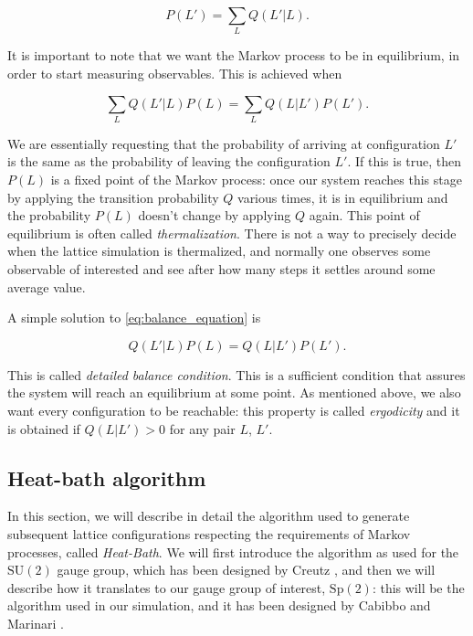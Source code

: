 \documentclass[reqno,12pt]{article}
\numberwithin{equation}{section}
\newcommand{\SU}{\mathrm{SU}}
\newcommand{\Sp}{\mathrm{Sp}}
\begin{document}
\begin{equation}
	P(L') = \sum_L Q(L' | L).
\end{equation}

It is important to note that we want the Markov process to be in equilibrium, in order to start measuring observables.
This is achieved when 

\begin{equation} \label{eq:balance_equation}
	\sum_L Q(L'| L) P(L) = \sum_L Q(L| L') P(L').
\end{equation}

We are essentially requesting that the probability of arriving at configuration $L'$ is the same as the probability
of leaving the configuration $L'$. If this is true, then $P(L)$ is a fixed point of the Markov process: once our system
reaches this stage by applying the transition probability $Q$ various times, it is in equilibrium and 
the probability $P(L)$ doesn't change by applying $Q$ again. This point of equilibrium is often called \textit{thermalization}.
There is not a way to precisely decide
when the lattice simulation is thermalized, and normally one observes some observable of interested and see after how many
steps it settles around some average value.

A simple solution to \eqref{eq:balance_equation} is

\begin{equation} \label{eq:detailed_balance_condition}
	Q(L'| L) P(L) = Q(L| L') P(L').
\end{equation}

This is called \textit{detailed balance condition}. This is a sufficient condition that assures the system will
reach an equilibrium at some point. As mentioned above, we also want every configuration to be reachable: this property
is called \textit{ergodicity} and it is obtained if $Q(L|L') > 0$ for any pair $L$, $L'$.

\subsection{Heat-bath algorithm} \label{heatbath}

In this section, we will describe in detail the algorithm used to generate subsequent lattice configurations respecting
the requirements of Markov processes, called \textit{Heat-Bath}. 
We will first introduce the algorithm as used for the $\SU(2)$ gauge group,
which has been designed by Creutz \cite{creutz}, and then we will describe 
how it translates to our gauge group of interest, $\Sp(2)$: this will be the algorithm used in our
simulation, and it has been designed by Cabibbo and Marinari \cite{cabibbo}.
\end{document}

